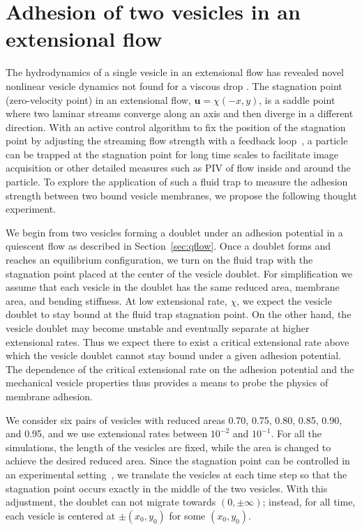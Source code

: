\documentclass[prf,superscriptaddress,showpacs]{revtex4-1}
\newcommand{\uu}{\mathbf{u}}
\begin{document}
\section{Adhesion of two vesicles in an extensional flow} 
\label{sec:eflow} 
The hydrodynamics of a single vesicle in an extensional flow has
revealed novel nonlinear vesicle dynamics not found for a viscous drop
\cite{KantslerSegreSteinberg2008_PRL, ZhaoShaqfeh2013_JFM,
Narsimhan2014_JFM,  DahlNarsimhanGouveia2016_SoftMatt}.  The stagnation
point (zero-velocity point) in an extensional flow, $\uu =\chi(-x,y) $,
is a saddle point where two laminar streams converge along an axis and
then diverge in a different direction.  With an active control algorithm
to fix the position of the stagnation point by adjusting the streaming
flow strength with a feedback loop~\cite{Johnson-Chavarria2011_EMJ}, a
particle can be trapped at the stagnation point for long time scales to
facilitate image acquisition or other detailed measures such as PIV of
flow inside and around the particle.  To explore the application of such
a fluid trap to measure the adhesion strength between two bound vesicle
membranes, we propose the following thought experiment.

We begin from two vesicles forming a doublet under an adhesion potential
in a quiescent flow as described in Section~\ref{sec:qflow}.  Once a
doublet forms and reaches an equilibrium configuration, we turn on the
fluid trap with the stagnation point placed at the center of the vesicle
doublet.  For simplification we assume that each vesicle in the doublet
has the same reduced area, membrane area, and bending stiffness.  At low
extensional rate, $\chi$, we expect the vesicle doublet to stay bound at
the fluid trap stagnation point.  On the other hand, the vesicle doublet
may become unstable and eventually separate at higher extensional rates.
Thus we expect there to exist a critical extensional rate above which
the vesicle doublet cannot stay bound under a given adhesion potential.
The dependence of the critical extensional rate on the adhesion
potential and the mechanical vesicle properties thus provides a means to
probe the physics of membrane adhesion.

We consider six pairs of vesicles with reduced areas 0.70, 0.75, 0.80,
0.85, 0.90, and 0.95, and we use extensional rates between $10^{-2}$ and
$10^{-1}$.  For all the simulations, the length of the vesicles are
fixed, while the area is changed to achieve the desired reduced area.
Since the stagnation point can be controlled in an experimental
setting~\cite{Johnson-Chavarria2011_EMJ}, we translate the vesicles at
each time step so that the stagnation point occurs exactly in the middle
of the two vesicles.  With this adjustment, the doublet can not migrate
towards $(0,\pm \infty)$; instead, for all time, each vesicle is
centered at $\pm(x_0,y_0)$ for some $(x_0,y_0)$.
\end{document}
